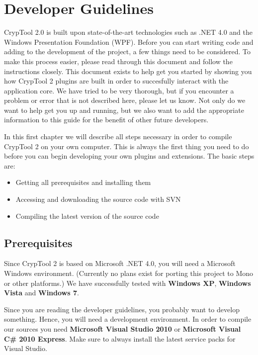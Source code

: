 \chapter{Developer Guidelines}
\label{DeveloperGuidelines}

CrypTool 2.0 is built upon state-of-the-art technologies such as .NET 4.0 and the Windows Presentation Foundation (WPF). Before you can start writing code and adding to the development of the project, a few things need to be considered. To make this process easier, please read through this document and follow the instructions closely. This document exists to help get you started by showing you how CrypTool 2 plugins are built in order to succesfully interact with the application core. We have tried to be very thorough, but if you encounter a problem or error that is not described here, please let us know. Not only do we want to help get you up and running, but we also want to add the appropriate information to this guide for the benefit of other future developers.

In this first chapter we will describe all steps necessary in order to compile CrypTool 2 on your own computer. This is always the first thing you need to do before you can begin developing your own plugins and extensions. The basic steps are:
\begin{itemize}
	\item Getting all prerequisites and installing them
	\item Accessing and downloading the source code with SVN
	\item Compiling the latest version of the source code
\end{itemize}

\section{Prerequisites}
\label{Prerequisites}

Since CrypTool 2 is based on Microsoft .NET 4.0, you will need a Microsoft Windows environment. (Currently no plans exist for porting this project to Mono or other platforms.) We have successfully tested with \textbf{Windows XP}, \textbf{Windows Vista} and \textbf{Windows 7}.

Since you are reading the developer guidelines, you probably want to develop something. Hence, you will need a development environment. In order to compile our sources you need \textbf{Microsoft Visual Studio 2010} or \textbf{Microsoft Visual C\# 2010 Express}. Make sure to always install the latest service packs for Visual Studio.

